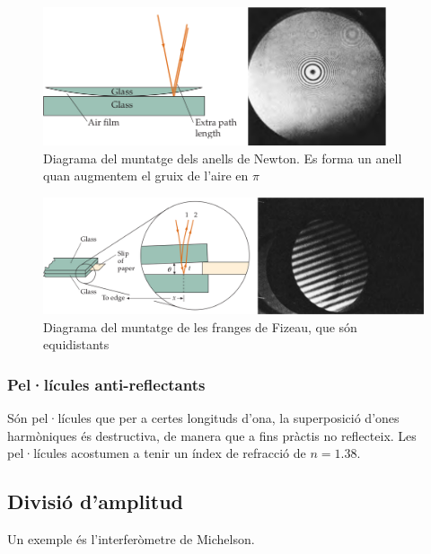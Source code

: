 \begin{figure}[H]
\centering
    \includegraphics[width=0.9\textwidth]{images/6/62-newton.png}
\caption{Diagrama del muntatge dels anells de Newton. Es forma un anell quan augmentem el gruix de l'aire en $\pi$}
\end{figure}
\begin{figure}[H]
\centering
    \includegraphics[width=\textwidth]{images/6/62-fizeau.png}
\caption{Diagrama del muntatge de les franges de Fizeau, que són equidistants}
\end{figure}

\subsubsection*{Pel·lícules anti-reflectants}
Són pel·lícules que per a certes longituds d'ona, la superposició d'ones harmòniques és destructiva, de manera que a fins pràctis no reflecteix. Les pel·lícules acostumen a tenir un índex de refracció de $n = 1.38$.

\subsection{Divisió d'amplitud}
Un exemple és l'interferòmetre de Michelson.

